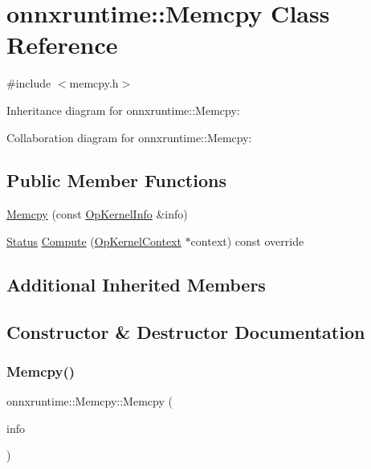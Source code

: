 \hypertarget{classonnxruntime_1_1Memcpy}{}\section{onnxruntime\+:\+:Memcpy Class Reference}
\label{classonnxruntime_1_1Memcpy}


{\ttfamily \#include $<$memcpy.\+h$>$}



Inheritance diagram for onnxruntime\+:\+:Memcpy\+:


Collaboration diagram for onnxruntime\+:\+:Memcpy\+:
\subsection*{Public Member Functions}
\begin{DoxyCompactItemize}
\item 
\mbox{\hyperlink{classonnxruntime_1_1Memcpy_abbf66229709b6bfdd05e9ddff3d34346}{Memcpy}} (const \mbox{\hyperlink{classonnxruntime_1_1OpKernelInfo}{Op\+Kernel\+Info}} \&info)
\item 
\mbox{\hyperlink{classonnxruntime_1_1common_1_1Status}{Status}} \mbox{\hyperlink{classonnxruntime_1_1Memcpy_a853b7bff38cb630dac17f6a19aadcbb6}{Compute}} (\mbox{\hyperlink{classonnxruntime_1_1OpKernelContext}{Op\+Kernel\+Context}} $\ast$context) const override
\end{DoxyCompactItemize}
\subsection*{Additional Inherited Members}


\subsection{Constructor \& Destructor Documentation}
\mbox{\label{classonnxruntime_1_1Memcpy_abbf66229709b6bfdd05e9ddff3d34346}} 
\subsubsection{\texorpdfstring{Memcpy()}{Memcpy()}}
{\footnotesize\ttfamily onnxruntime\+::\+Memcpy\+::\+Memcpy (\begin{DoxyParamCaption}\item[{const \mbox{\hyperlink{classonnxruntime_1_1OpKernelInfo}{Op\+Kernel\+Info}} \&}]{info }\end{DoxyParamCaption})}



